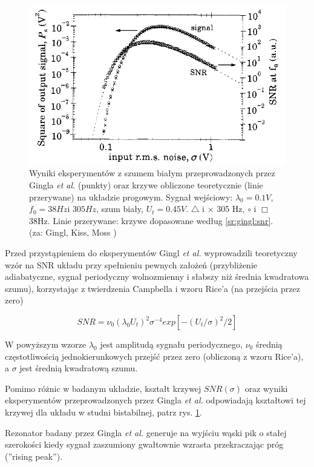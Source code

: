   \begin{figure}
    \includegraphics[width=120mm]{images/gingl_2.png}
    \caption{Wyniki eksperymentów z szumem białym przeprowadzonych przez Gingla \emph{et al.} (punkty) oraz krzywe obliczone teoretycznie (linie przerywane) na układzie progowym. Sygnał wejściowy: $\lambda_0 = 0.1V$, $f_0 = 38 Hz \text{i } 305 Hz $, szum biały, $U_t = 0.45V$. $\triangle$ i $\times$ 305 Hz, $\circ$ i $\Box$ 38Hz. Linie przerywane: krzywe dopasowane według \ref{sr:gingl:snr}. (za: Gingl, Kiss, Moss \cite{gingl_kiss_moss} )}
    \label{fig:graphics:gingl2}
  \end{figure}

  Przed przystąpieniem do eksperymentów Gingl \emph{et al.} wyprowadzili teoretyczny wzór na SNR układu przy spełnieniu pewnych założeń (przybliżenie adiabatyczne, sygnał periodyczny wolnozmienny i słabszy niż średnia kwadratowa szumu), korzystając z twierdzenia Campbella i wzoru Rice'a (na przejścia przez zero) \cite{rice}

  \begin{equation} \label{sr:gingl:snr}
    SNR = \nu_0 (\lambda_0 U_t)^2 \sigma ^{-4} exp [-(U_t/{\sigma})^2 / 2]
  \end{equation}

  W powyższym wzorze $\lambda_0$ jest amplitudą sygnału periodycznego, $\nu_0$ średnią częstotliwością jednokierunkowych przejść przez zero (obliczoną z wzoru Rice'a), a $\sigma$ jest średnią kwadratową szumu.

  Pomimo różnic w badanym układzie, kształt krzywej $SNR(\sigma)$ oraz wyniki eksperymentów przeprowadzonych przez Gingla \emph{et al.} odpowiadają kształtowi tej krzywej dla układu w studni bistabilnej, patrz rys. \ref{fig:graphics:gingl2}.


  Rezonator badany przez Gingla \emph{et al.} generuje na wyjściu wąski pik o stałej szerokości kiedy sygnał zaszumiony gwałtownie wzrasta przekraczając próg (''rising peak'').

